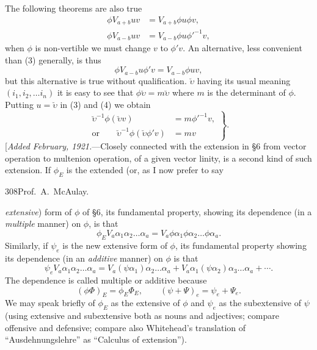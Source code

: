 \documentclass[11pt]{article}
\begin{document}
\indent The following theorems are also true
\begin{align}\phi V_{a+b}uv&=V_{a+b}\phi u\phi v,\tag{2}\\\phi V_{a-b}uv&=V_{a-b}\phi u\phi'^{-1}v,\tag{3}\end{align}
when $\phi$ is non-vertible we must change $v$ to $\phi'v$. An alternative, less convenient than (3) generally, is thus
\begin{equation}\phi V_{a-b}u\phi'v=V_{a-b}\phi uv,\tag{4}\end{equation}
but this alternative is true without qualification. $\breve\upsilon$ having its usual meaning $(i_1,i_2,\ldots i_n)$ it is easy to see that $\phi\breve\upsilon=m\breve\upsilon$ where $m$ is the determinant of $\phi$. Putting $u=\breve\upsilon$ in (3) and (4) we obtain
\begin{equation}\left.\begin{aligned}\breve\upsilon^{-1}\phi(\breve\upsilon v)&=m\phi'^{-1}v,\\\text{or}\qquad\breve\upsilon^{-1}\phi(\breve\upsilon\phi'v)&=mv\end{aligned}\right\}.\tag{5}\end{equation}
[\emph{Added February, 1921.}---Closely connected with the extension in §6 from vector operation to multenion operation, of a given vector linity, is a second kind of such extension. If $\phi_E$ is the extended (or, as I now prefer to say

\newpage\thispagestyle{empty}\begin{center}308\hfill Prof.\ A.\ McAulay.\end{center}
\emph{extensive}) form of $\phi$ of §6, its fundamental property, showing its dependence (in a \emph{multiple} manner) on $\phi$, is that
\begin{equation}\phi_E V_a\alpha_1\alpha_2\ldots\alpha_a=V_a\phi\alpha_1\phi\alpha_2\ldots\phi\alpha_a.\tag{1}\end{equation}
Similarly, if $\psi_e$ is the new extensive form of $\phi$, its fundamental property showing its dependence (in an \emph{additive} manner) on $\phi$ is that
\begin{equation}\psi_eV_a\alpha_1\alpha_2\ldots\alpha_a=V_a(\psi\alpha_1)\alpha_2\ldots\alpha_a+V_a\alpha_1(\psi\alpha_2)\alpha_3\ldots\alpha_a+\cdots.\tag{2}\end{equation}
The dependence is called multiple or additive because
\begin{equation}(\phi\Phi)_E=\phi_E\Phi_E,\qquad(\psi+\Psi)_e=\psi_e+\Psi_e.\tag{3}\end{equation}
We may speak briefly of $\phi_E$ as the extensive of $\phi$ and $\psi_e$ as the subextensive of $\psi$ (using extensive and subextensive both as nouns and adjectives; compare offensive and defensive; compare also Whitehead's translation of ``Ausdehnungslehre'' as ``Calculus of extension'').
\end{document}
